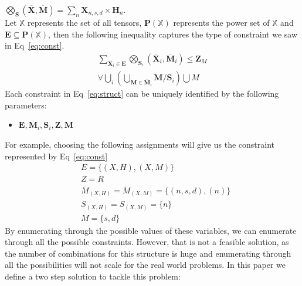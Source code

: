 \documentclass{article}
\newcommand{\TX}{\textbf{X}\xspace}
\newcommand{\TZ}{\textbf{Z}\xspace}
\newcommand{\TP}{\textbf{P}\xspace}
\newcommand{\TM}{\textbf{M}\xspace}
\newcommand{\TE}{\textbf{E}\xspace}
\begin{document}
$\bigotimes_{\textbf{S}}(\overline{\TX}, \overline{\TM})=\sum_{n} \TX_{n,s,d} \times \textbf{H}_{n}$.
\\
Let $\mathbb{X}$ represents the set of all tensors, $\TP(\mathbb{X})$ represents the power set of $\mathbb{X}$ and $\TE \subseteq \TP(\mathbb{X})$, then the following inequality captures the type of constraint we saw in Eq~\ref{eq:const}.
\begin{multline}
\label{eq:struct}
	\displaystyle\sum\limits_{\overline{\TX}_i \in \TE}\bigotimes_{\textbf{S}_i}(\overline{\TX}_i,\overline{\TM}_i) \le \TZ_{M}\\ \forall \bigcup_{i}(\bigcup_{\TM \in \overline{\TM}_i} \TM / \textbf{S}_i) \bigcup M 
\end{multline}
Each constraint in Eq~\ref{eq:struct} can be uniquely identified by the following parameters:
\begin{itemize}
\item $\TE, \overline{\TM}_i,\textbf{S}_i, \TZ, \TM$
\end{itemize}
For example, choosing the following assignments will give us the constraint represented by Eq~\ref{eq:const}
\begin{align*}
&E=\{(X,H),(X,M)\}\\
&Z=R\\
&\overline{M}_{(X,H)}=\overline{M}_{(X,M)}=\{(n,s,d), (n)\}\\
&S_{(X,H)}=S_{(X,M)}=\{n\}\\
&M=\{s,d\}
\end{align*}
By enumerating through the possible values of these variables, we can enumerate through all the possible constraints. However, that is not a feasible solution, as the number of combinations for this structure is huge and enumerating through all the possibilities will not scale for the real world problems. In this paper we define a two step solution to tackle this problem:
\end{document}
